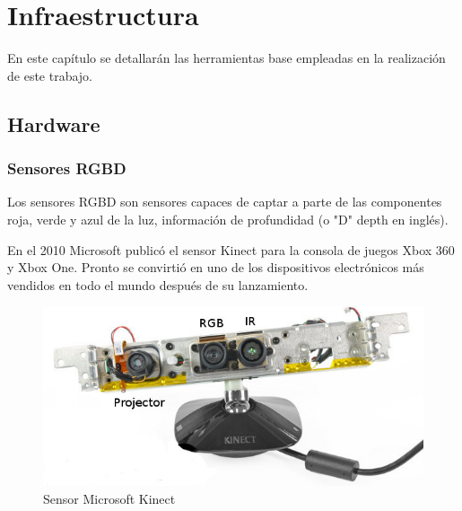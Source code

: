 
\chapter{Infraestructura} %

\label{Chapter1} %

En este capítulo se detallarán las herramientas base empleadas en la realización de este trabajo.

\section{Hardware}

\subsection{Sensores RGBD}

Los sensores RGBD son sensores capaces de captar a parte de las componentes roja, verde y azul de la luz, información de profundidad (o "D" depth en inglés). 

En el 2010 Microsoft publicó el sensor Kinect para la consola de juegos Xbox 360 y Xbox One. Pronto se convirtió en uno de los dispositivos electrónicos más vendidos en todo el mundo después de su lanzamiento.

\begin{figure}[th]
\centering
\includegraphics[scale=0.9]{Figures/ros_kinect.jpg}
\decoRule
\caption[Kinect sensor]{Sensor Microsoft Kinect}
\label{fig:Kinect}
\end{figure}

